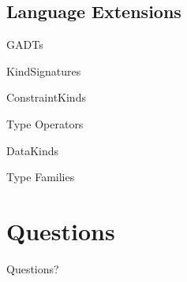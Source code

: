 \documentclass[xcolor={usenames,dvipsnames}]{beamer}
\begin{document}
\subsection{Language Extensions}

\begin{frame}[fragile]{GADTs}
\end{frame}

\begin{frame}[fragile]{KindSignatures}
\end{frame}

\begin{frame}[fragile]{ConstraintKinds}
\end{frame}

\begin{frame}[fragile]{Type Operators}
\end{frame}

\begin{frame}[fragile]{DataKinds}
\end{frame}

\begin{frame}[fragile]{Type Families}
\end{frame}


\section{Questions}

\begin{frame}
  Questions?
\end{frame}
\end{document}
